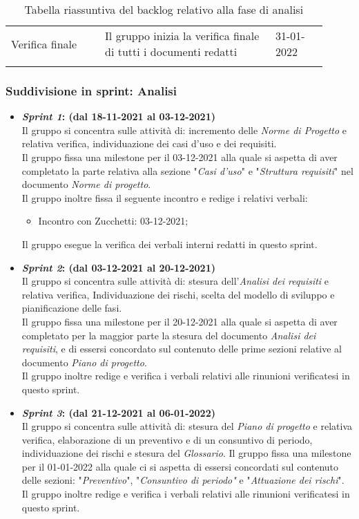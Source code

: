 {\begin{longtable}{p{0.27\linewidth}p{0.49\linewidth}p{0.15\linewidth}}
    \rowcolor[RGB]{233, 245, 206}
    Verifica finale & Il gruppo inizia la verifica finale di tutti i documenti redatti & 31-01-2022\\

    \caption{Tabella riassuntiva del backlog relativo alla fase di analisi}
\end{longtable}	
}

\subsubsection{Suddivisione in sprint: Analisi}
\begin{itemize}
    \item \textbf{\textit{Sprint 1}: (dal 18-11-2021 al 03-12-2021)}\\
    Il gruppo si concentra sulle attività di: incremento delle \textit{Norme di Progetto} e relativa verifica, individuazione dei casi d'uso e dei requisiti.\\
    Il gruppo fissa una milestone per il 03-12-2021 alla quale si aspetta di aver completato la parte relativa alla sezione "\textit{Casi d'uso}" e "\textit{Struttura requisiti}" nel documento \textit{Norme di progetto}.\\
    Il gruppo inoltre fissa il seguente incontro e redige i relativi verbali:
    \begin{itemize}
        \item Incontro con Zucchetti: 03-12-2021;
    \end{itemize} 
    Il gruppo esegue la verifica dei verbali interni redatti in questo sprint.

    \item \textbf{\textit{Sprint 2}: (dal 03-12-2021 al 20-12-2021)}\\
    Il gruppo si concentra sulle attività di: stesura dell'\textit{Analisi dei requisiti} e relativa verifica, Individuazione dei rischi, scelta del modello di sviluppo e pianificazione delle fasi.\\
    Il gruppo fissa una milestone per il 20-12-2021 alla quale si aspetta di aver completato per la maggior parte la stesura del documento \textit{Analisi dei requisiti}, e di essersi concordato sul contenuto delle prime sezioni relative al documento \textit{Piano di progetto}.\\
    Il gruppo inoltre redige e verifica i verbali relativi alle rinunioni verificatesi in questo sprint.

    \item \textbf{\textit{Sprint 3}: (dal 21-12-2021 al 06-01-2022)}\\
    Il gruppo si concentra sulle attività di: stesura del \textit{Piano di progetto} e relativa verifica, elaborazione di un preventivo e di un consuntivo di periodo, individuazione dei rischi e stesura del \textit{Glossario}.
    Il gruppo fissa una milestone per il 01-01-2022 alla quale ci si aspetta di essersi concordati sul contenuto delle sezioni: "\textit{Preventivo}", "\textit{Consuntivo di periodo"} e "\textit{Attuazione dei rischi}". 
    Il gruppo inoltre redige e verifica i verbali relativi alle rinunioni verificatesi in questo sprint.


\end{itemize}
